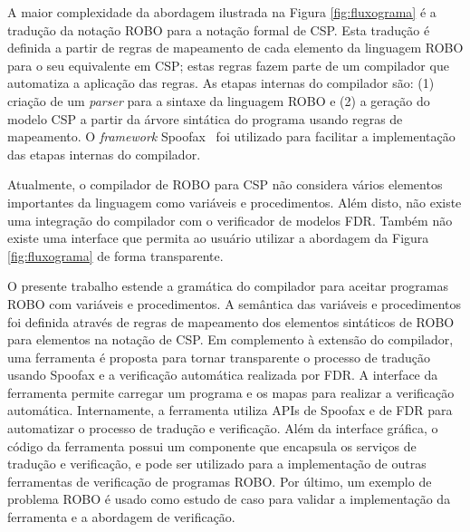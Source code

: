 A maior complexidade da abordagem ilustrada na Figura \ref{fig:fluxograma} é a tradução da notação ROBO para a notação formal de CSP. Esta tradução é definida a partir de regras de mapeamento de cada elemento da linguagem ROBO para o seu equivalente em CSP; estas regras fazem parte de um compilador que automatiza a aplicação das regras. 
As etapas internas do compilador são: (1) criação de um \textit{parser} para a sintaxe da linguagem ROBO e (2) a geração do modelo CSP a partir da árvore sintática do programa usando regras de mapeamento. 
O \textit{framework} Spoofax~\cite{KatsSpoofax} foi utilizado para facilitar a implementação das etapas internas do compilador. 

Atualmente, o compilador de ROBO para CSP não considera vários elementos importantes da linguagem como variáveis e procedimentos. Além disto, não existe uma integração do compilador com o verificador de modelos FDR. Também não existe uma interface que permita ao usuário utilizar a abordagem da Figura \ref{fig:fluxograma} de forma transparente. 

O presente trabalho estende a gramática do compilador para aceitar programas ROBO com variáveis e procedimentos. A semântica das variáveis e procedimentos foi definida através de regras de mapeamento dos elementos sintáticos de ROBO para elementos na notação de CSP. Em complemento à extensão do compilador, uma ferramenta é proposta para tornar transparente o processo de tradução usando Spoofax e a verificação automática realizada por FDR. A interface da ferramenta permite carregar um programa e os mapas para realizar a verificação automática. Internamente, a ferramenta utiliza APIs de Spoofax e de FDR para automatizar o processo de tradução e verificação. Além da interface gráfica, o código da ferramenta possui um componente que encapsula os serviços de tradução e verificação, e pode ser utilizado para a implementação de outras ferramentas de verificação de programas ROBO. Por último, um exemplo de problema ROBO é usado como estudo de caso para validar a implementação da ferramenta e a abordagem de verificação.

